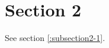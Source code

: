 \documentclass[../../main.tex]{subfiles}
\begin{document}
\section{Section 2}\label{section2}

See section \ref{:subsection2-1}.


\end{document}
